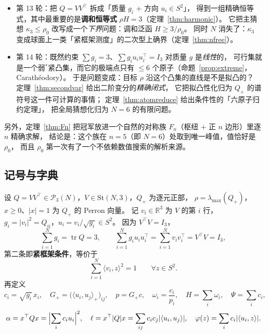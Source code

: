 \documentclass[UTF8,11pt]{ctexart}
\theoremstyle{definition}
\newcommand{\tr}{\operatorname{tr}}
\newcommand{\R}{\mathbb{R}}
\begin{document}
\begin{itemize}[leftmargin=2em]
\item 第 13 轮：把 $Q=VV^\top$ 拆成「质量 $g_i$ $+$ 方向 $u_i\in S^2$」，
得到一组精确恒等式，其中最重要的是\textbf{调和恒等式} $\rho H=3$（定理~\ref{thm:harmonic}）。
它把主猜想 $\kappa_3\le\rho_0$ 改写成一个\emph{下界}问题：调和泛函 $H\ge 3/\rho_0$。
同时 $N$ 消失了：$\kappa_3$ 变成球面上一类「紧框架测度」的二次型上确界（定理~\ref{thm:nfree}）。
\item 第 14 轮：既然约束 $\sum g_i=3$、$\sum g_iu_iu_i^\top=I_3$ 对质量 $g$ 是\emph{线性}的，
可行集就是一个弱$^*$紧凸集，而它的极端点只有 $\le6$ 个原子（命题~\ref{prop:extreme}，Carathéodory）。
于是问题变成：目标 $\rho$ 沿这个凸集的直线是不是拟凸的？
定理~\ref{thm:secondvar} 给出二阶变分的\emph{精确闭式}，
它把拟凸性化归为 $Q_+$ 的谱符号这一件可计算的事情；
定理~\ref{thm:atomreduce} 给出条件性的「六原子归约定理」，
把全局猜想化归为 $N=6$ 的有限问题。
\end{itemize}

另外，定理~\ref{thm:Fn} 把冠军放进一个自然的对称族 $F_n$（枢纽 $+$ 正 $n$ 边形）里逐 $n$ 精确求解，
结论是：这个族在 $n=5$（即 $N=6$）处取到唯一峰值，值恰好是 $\rho_0$，
而且 $\rho_0$ 第一次有了一个不依赖数值搜索的解析来源。

\subsection{记号与字典}\label{sec:harm:dict}

设 $Q=VV^\top\in\mathcal P_3(N)$，$V\in\mathrm{St}(N,3)$，$Q_+$ 为逐元正部，
$\rho=\lambda_{\max}(Q_+)$，$x\ge0$、$|x|=1$ 为 $Q_+$ 的 Perron 向量。
记 $v_i\in\R^3$ 为 $V$ 的第 $i$ 行，$g_i=|v_i|^2=Q_{ii}$，$u_i=v_i/\sqrt{g_i}\in S^2$。
因为 $V^\top V=I_3$，
\begin{equation}\label{eq:frame}
\sum_{i=1}^N g_i=\tr Q=3,\qquad
\sum_{i=1}^N g_iu_iu_i^\top=\sum_{i=1}^N v_iv_i^\top=V^\top V=I_3 ,
\end{equation}
第二条即\textbf{紧框架条件}，等价于
\begin{equation}\label{eq:framez}
\sum_{i=1}^N\langle v_i,z\rangle^2=1\qquad\forall z\in S^2 .
\end{equation}
再定义
\[
c_i=\sqrt{g_i}\,x_i,\quad
G_+=\bigl(\langle u_i,u_j\rangle_+\bigr)_{ij},\quad
p=G_+c,\quad
\omega_i=\frac{c_i}{p_i},\quad
H=\sum_i\omega_i,\quad
\Psi=\sum_ic_i ,
\]
\[
\alpha=x^\top Qx=\Bigl|\sum_ic_iu_i\Bigr|^2,\quad
\ell=x^\top|Q|x=\sum_{ij}c_ic_j|\langle u_i,u_j\rangle|,\quad
\varphi(z)=\sum_ic_i|\langle u_i,z\rangle| .
\]
\end{document}
